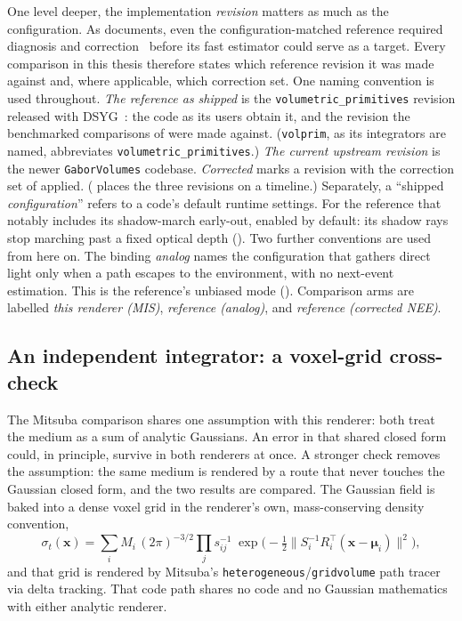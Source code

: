 One level deeper, the implementation \emph{revision} matters as much as the
configuration. As  documents, even the configuration-matched reference
required diagnosis and correction~\cite{KramarzVolprimFixes2026} before its fast estimator could serve
as a target. Every comparison in this thesis therefore states which reference revision it was made
against and, where applicable, which correction set. One naming convention is used throughout.
\emph{The reference as shipped} is the \texttt{volumetric\_primitives} revision released with
DSYG~\cite{DSYG}: the code as its users obtain it, and the revision the benchmarked comparisons of
 were made against. (\texttt{volprim}, as its integrators are named, abbreviates
\texttt{volumetric\_primitives}.) \emph{The current upstream revision} is the newer
\texttt{GaborVolumes} codebase. \emph{Corrected} marks a revision with the correction set of
 applied. ( places the three revisions on a
timeline.) Separately, a ``shipped \emph{configuration}'' refers to a
code's default runtime settings. For the reference that notably includes its shadow-march
early-out, enabled by default: its shadow rays stop marching past a fixed optical depth
(). Two further conventions are used from here on. The binding
\emph{analog} names the
configuration that gathers direct light only when a path escapes to the environment, with no
next-event estimation. This is the reference's unbiased mode (). Comparison arms
are labelled \emph{this renderer (MIS)}, \emph{reference (analog)}, and \emph{reference (corrected
NEE)}.

\subsection{An independent integrator: a voxel-grid cross-check}
\label{sec:voxel-gt}

The Mitsuba comparison shares one assumption with this renderer: both treat the medium as a
sum of analytic Gaussians. An error in that shared closed form could, in principle, survive
in both renderers at once. A stronger check removes the assumption: the same medium is
rendered by a route that never touches the Gaussian closed form, and the two results are
compared. The Gaussian field is baked into a dense voxel grid in the renderer's own,
mass-conserving density convention,
\[
  \sigma_t(\mathbf{x})=\sum_i M_i\,(2\pi)^{-3/2}\!\prod_j s_{ij}^{-1}\;
  \exp\!\big(-\tfrac12\lVert S_i^{-1}R_i^{\!\top}(\mathbf{x}-\boldsymbol\mu_i)\rVert^2\big),
\]
and that grid is rendered by Mitsuba's \texttt{heterogeneous}/\texttt{gridvolume} path tracer
via delta tracking. That code path shares no code and no Gaussian mathematics with either
analytic renderer.

